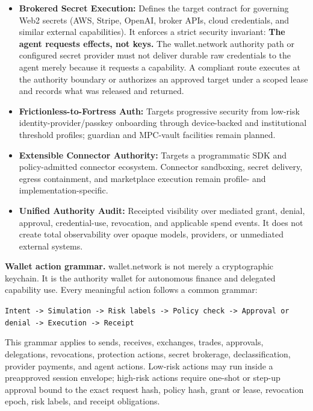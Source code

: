 \documentclass[
  11pt,
]{article}
\providecommand{\tightlist}{%
  \setlength{\itemsep}{0pt}\setlength{\parskip}{0pt}}
\begin{document}
\begin{itemize}
\tightlist
\item
  \textbf{Brokered Secret Execution:} Defines the target contract for governing Web2 secrets (AWS,
  Stripe, OpenAI, broker APIs, cloud credentials, and similar external
  capabilities). It enforces a strict security invariant:
  \textbf{The agent requests effects, not keys.} The wallet.network
  authority path or configured secret provider must not deliver durable raw
  credentials to the agent merely because it requests a capability. A compliant
  route executes at the authority boundary or authorizes an approved target
  under a scoped lease and records what was released and returned.
\item
  \textbf{Frictionless-to-Fortress Auth:} Targets progressive security from
  low-risk identity-provider/passkey onboarding through device-backed and
  institutional threshold profiles; guardian and MPC-vault facilities remain
  planned.
\item
  \textbf{Extensible Connector Authority:} Targets a programmatic SDK and
  policy-admitted connector ecosystem. Connector sandboxing, secret delivery,
  egress containment, and marketplace execution remain profile- and
  implementation-specific.
\item
  \textbf{Unified Authority Audit:} Receipted visibility over mediated grant,
  denial, approval, credential-use, revocation, and applicable spend events.
  It does not create total observability over opaque models, providers, or
  unmediated external systems.
\end{itemize}

\textbf{Wallet action grammar.} wallet.network is not merely a
cryptographic keychain. It is the authority wallet for autonomous
finance and delegated capability use. Every meaningful action follows a
common grammar:

\begin{center}
\texttt{Intent -> Simulation -> Risk labels -> Policy check -> Approval or denial -> Execution -> Receipt}
\end{center}

This grammar applies to sends, receives, exchanges, trades, approvals,
delegations, revocations, protection actions, secret brokerage,
declassification, provider payments, and agent actions. Low-risk actions
may run inside a preapproved session envelope; high-risk actions require
one-shot or step-up approval bound to the exact request hash, policy
hash, grant or lease, revocation epoch, risk labels, and receipt
obligations.
\end{document}
